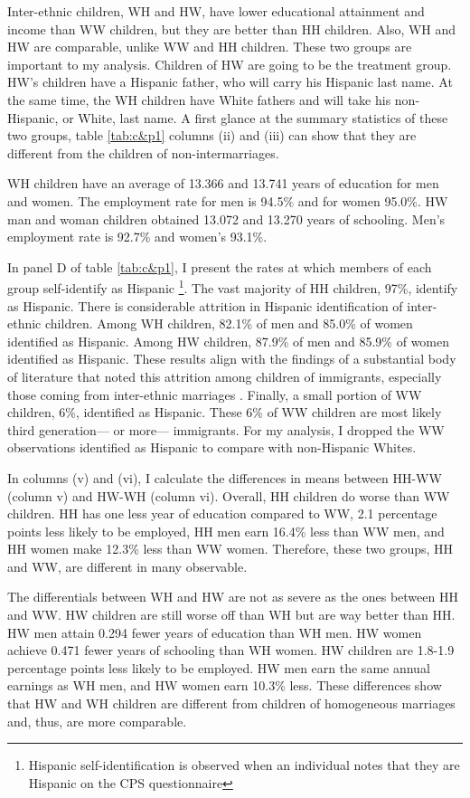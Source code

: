 \documentclass[12pt, fullpage]{article}
\begin{document}
Inter-ethnic children, WH and HW, have lower educational attainment and income than WW children, but they are better than HH children. Also, WH and HW are comparable, unlike WW and HH children. These two groups are important to my analysis. Children of HW are going to be the treatment group. HW's children have a Hispanic father, who will carry his Hispanic last name. At the same time, the WH children have White fathers and will take his non-Hispanic, or White, last name. A first glance at the summary statistics of these two groups, table \ref{tab:c&p1} columns (ii) and (iii) can show that they are different from the children of non-intermarriages. 

WH children have an average of 13.366 and 13.741 years of education for men and women. The employment rate for men is 94.5\% and for women 95.0\%. HW man and woman children obtained 13.072 and 13.270 years of schooling. Men's employment rate is 92.7\% and women's 93.1\%.

In panel D of table \ref{tab:c&p1}, I present the rates at which members of each group self-identify as Hispanic \footnote{Hispanic self-identification is observed when an individual notes that they are Hispanic on the CPS questionnaire}. The vast majority of HH children, 97\%, identify as Hispanic. There is considerable attrition in Hispanic identification of inter-ethnic children. Among WH children, 82.1\% of men and 85.0\% of women identified as Hispanic. Among HW children, 87.9\% of men and 85.9\% of women identified as Hispanic. These results align with the findings of a substantial body of literature that noted this attrition among children of immigrants, especially those coming from inter-ethnic marriages \citep{duncan2017complexity, duncan2018identifying, duncan2020new, antman2020ethnic}. Finally, a small portion of WW children, 6\%, identified as Hispanic. These 6\% of WW children are most likely third generation--- or more--- immigrants. For my analysis, I dropped the WW observations identified as Hispanic to compare with non-Hispanic Whites.

In columns (v) and (vi), I calculate the differences in means between HH-WW (column v) and HW-WH (column vi). Overall, HH children do worse than WW children. HH has one less year of education compared to WW, 2.1 percentage points less likely to be employed, HH men earn 16.4\% less than WW men, and HH women make 12.3\% less than WW women. Therefore, these two groups, HH and WW, are different in many observable.

The differentials between WH and HW are not as severe as the ones between HH and WW. HW children are still worse off than WH but are way better than HH. HW men attain 0.294 fewer years of education than WH men. HW women achieve 0.471 fewer years of schooling than WH women. HW children are 1.8-1.9 percentage points less likely to be employed. HW men earn the same annual earnings as WH men, and HW women earn 10.3\% less. These differences show that HW and WH children are different from children of homogeneous marriages and, thus, are more comparable.
\end{document}
